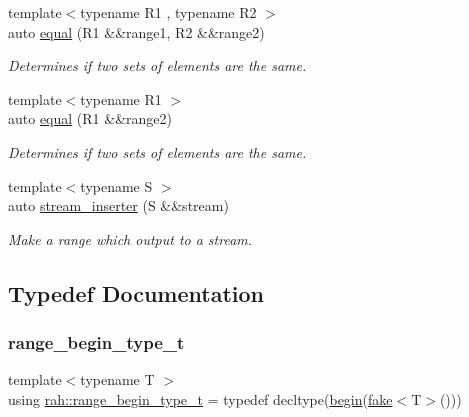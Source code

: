\begin{DoxyCompactItemize}
{\footnotesize template$<$typename R1 , typename R2 $>$ }\\auto \mbox{\hyperlink{namespacerah_abf321dffb33d6a2d752aa091fdba7bbf}{equal}} (R1 \&\&range1, R2 \&\&range2)
\begin{DoxyCompactList}\small\item\em Determines if two sets of elements are the same. \end{DoxyCompactList}\item 
{\footnotesize template$<$typename R1 $>$ }\\auto \mbox{\hyperlink{namespacerah_a3434aacc26937d3ff50b5db4286feda6}{equal}} (R1 \&\&range2)
\begin{DoxyCompactList}\small\item\em Determines if two sets of elements are the same. \end{DoxyCompactList}\item 
{\footnotesize template$<$typename S $>$ }\\auto \mbox{\hyperlink{namespacerah_a3f7b590b1bd8a44b5b2d6f4e35f1837c}{stream\+\_\+inserter}} (S \&\&stream)
\begin{DoxyCompactList}\small\item\em Make a range which output to a stream. \end{DoxyCompactList}\end{DoxyCompactItemize}


\subsection{Typedef Documentation}
\mbox{\label{namespacerah_a28aff4eeddcece6be65ff0b956d32d4a}} 
\subsubsection{\texorpdfstring{range\_begin\_type\_t}{range\_begin\_type\_t}}
{\footnotesize\ttfamily template$<$typename T $>$ \\
using \mbox{\hyperlink{namespacerah_a28aff4eeddcece6be65ff0b956d32d4a}{rah\+::range\+\_\+begin\+\_\+type\+\_\+t}} = typedef decltype(\mbox{\hyperlink{namespacerah_a2c4a19e57cc4e0753e93830f247def6d}{begin}}(\mbox{\hyperlink{namespacerah_a11785bbdf970efa1bc57fc14993b77bf}{fake}}$<$T$>$()))}

\mbox{\label{namespacerah_a9657e24ae477f4482225b133fe286b65}} 
